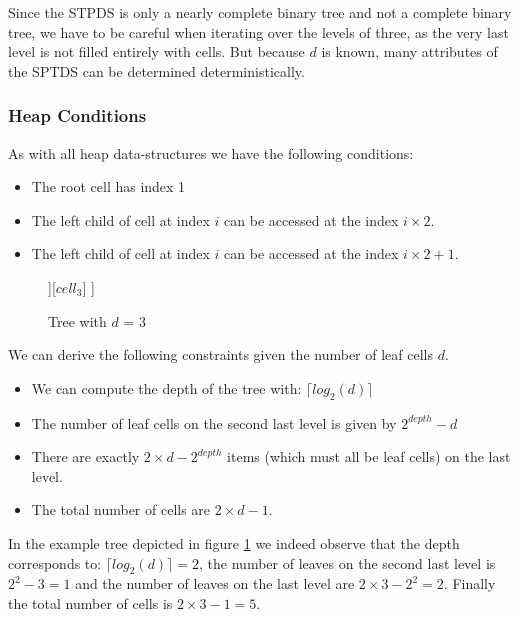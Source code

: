 \documentclass[]{article}
\begin{document}
Since the STPDS is only a nearly complete binary tree and not a complete binary tree, we have to be careful when iterating over the levels of three, as the very last level is not filled entirely with cells. But because $d$ is known, many attributes of the SPTDS can be determined deterministically.

\subsubsection{Heap Conditions}
As with all heap data-structures we have the following conditions:

\begin{itemize}
	\item The root cell has index 1
	\item The left child of cell at index $i$ can be accessed at the index $i\times2$. 
	\item The left child of cell at index $i$ can be accessed at the index $i\times2 + 1$. 
\end{itemize}

\begin{figure}[H]
	\centering
	\begin{forest}
		[$cell_1$
		[$cell_2$ [$cell_4$] [$cell_5$]][$cell_3$]  
		]
	\end{forest}
	\caption{Tree with $d$ = 3}
	\label{fig:extree}
\end{figure}

\vspace{0.5cm}
We can derive the following constraints given the number of leaf cells $d$. 

\begin{itemize}
	\item We can compute the depth of the tree with: $\lceil log_2(d) \rceil$
	\item The number of leaf cells on the second last level is given by $2^{depth} - d$ 
	\item There are exactly $2 \times d - 2^{depth}$ items (which must all be leaf cells) on the last level. 
	\item The total number of cells are $2\times d - 1$.
\end{itemize}

In the example tree depicted in figure \ref{fig:extree} we indeed observe that the depth corresponds to: $\lceil log_2(d) \rceil = 2$, the number of leaves on the second last level is  $2^{2} - 3 = 1$ and the number of leaves on the last level are $2 \times 3 - 2^{2} = 2$. Finally the total number of cells is $2\times 3 - 1 = 5$.
\end{document}
